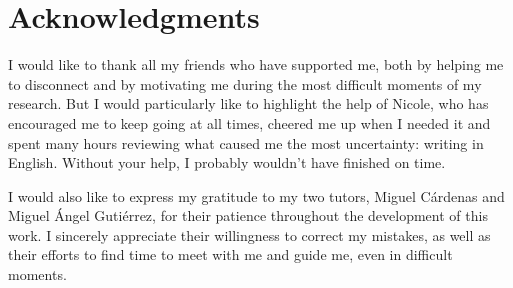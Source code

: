 \chapter*{Acknowledgments}

I would like to thank all my friends who have supported me, both by helping me to disconnect and by motivating me during the most difficult moments of my research. But I would particularly like to highlight the help of Nicole, who has encouraged me to keep going at all times, cheered me up when I needed it and spent many hours reviewing what caused me the most uncertainty: writing in English. Without your help, I probably wouldn't have finished on time.

I would also like to express my gratitude to my two tutors, Miguel Cárdenas and Miguel Ángel Gutiérrez, for their patience throughout the development of this work. I sincerely appreciate their willingness to correct my mistakes, as well as their efforts to find time to meet with me and guide me, even in difficult moments.